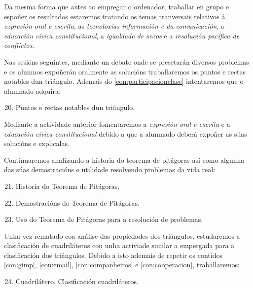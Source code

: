 Da mesma forma que antes ao empregar o ordenador, traballar en grupo e espoñer os resultados estaremos tratando os temas tranversais relativos á \emph{expresión oral e escrita}, as \emph{tecnoloxías información e da comunicación}, a \emph{educación cívica constitucional}, a \emph{igualdade de sexos} e a \emph{resolución pacífica de conflictos}.

Nas sesións seguintes, mediante un debate onde se presetarán diversos problemas e os alumnos expoñerán oralmente as solucións traballaremos os puntos e rectas notables dun triángulo. Ademais do \ref{con:participacionclase} intentaremos que o alumnado adquira:

\begin{enumerate}[label=\bfseries Con\arabic*, align=left, leftmargin=1.5cm]
  \setcounter{enumi}{19}
  \item\label{con:puntosrectasnotables} Puntos e rectas notables dun triángulo.
\end{enumerate}

Mediante a actividade anterior fomentaremos a \emph{expresión oral e escrita} e a \emph{educación cívica constitucional} debido a que a alumnado deberá expoñer as súas solucións e explicalas.

Continuaremos analizando a historia do teorema de pitágoras así como algunha das súas demostracións e utilidade resolvendo problemas da vida real:

\begin{enumerate}[label=\bfseries Con\arabic*, align=left, leftmargin=1.5cm]
  \setcounter{enumi}{20}
  \item\label{con:histpitag} Historia do Teorema de Pitágoras.
  \item\label{con:dempitag} Demostracións do Teorema de Pitágoras.
  \item\label{con:problepitag} Uso do Teorema de Pitágoras para a resolución de problemas.
\end{enumerate}

Unha vez rematado coa análise das propiedades dos triángulos, estudaremos a clasificación de cuadriláteros con unha activiade similar a empergada para a clasificación dos triángulos. Debido a isto ademais de repetir os contidos \ref{con:gimp}, \ref{con:email}, \ref{con:companheiros} e \ref{con:cooperacion}, traballaremos:

\begin{enumerate}[label=\bfseries Con\arabic*, align=left, leftmargin=1.5cm]
  \setcounter{enumi}{23}
  \item\label{con:cuadrilateros} Cuadrilátero. Clasificación cuadriláteros.
\end{enumerate}

